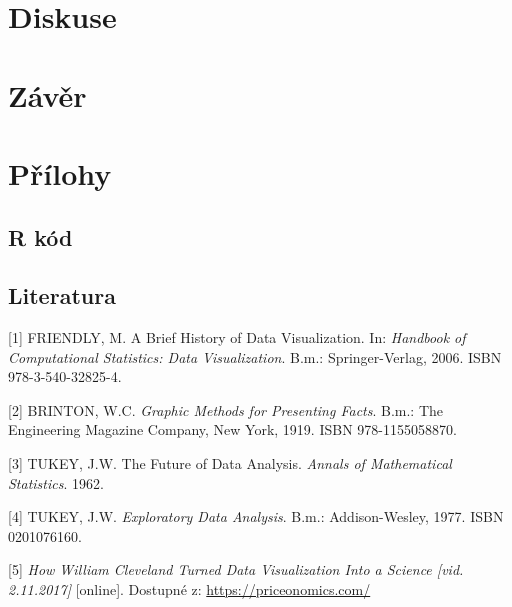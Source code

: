 \documentclass[12pt,]{article}
\begin{document}
\section*{Diskuse}\label{diskuse}

\newpage

\section*{Závěr}\label{zaver}

\newpage

\section*{Přílohy}\label{prilohy}


\listoffigures

\newpage

\subsection{R kód}\label{r-kod}

\newpage

\subsection*{Literatura}\label{literatura}

\hypertarget{refs}{}
\hypertarget{ref-dataviz_history}{}
{[}1{]} FRIENDLY, M. A Brief History of Data Visualization. In:
\emph{Handbook of Computational Statistics: Data Visualization}. B.m.:
Springer-Verlag, 2006. ISBN 978-3-540-32825-4.

\hypertarget{ref-brinton_1919}{}
{[}2{]} BRINTON, W.C. \emph{Graphic Methods for Presenting Facts}. B.m.:
The Engineering Magazine Company, New York, 1919. ISBN 978-1155058870.

\hypertarget{ref-tukey1962}{}
{[}3{]} TUKEY, J.W. The Future of Data Analysis. \emph{Annals of
Mathematical Statistics}. 1962.

\hypertarget{ref-tukey1977}{}
{[}4{]} TUKEY, J.W. \emph{Exploratory Data Analysis}. B.m.:
Addison-Wesley, 1977. ISBN 0201076160.

\hypertarget{ref-cleveland_priceonomics}{}
{[}5{]} \emph{How William Cleveland Turned Data Visualization Into a
Science {[}vid. 2.11.2017{]}} {[}online{]}. Dostupné z:
\url{https://priceonomics.com/}
\end{document}
